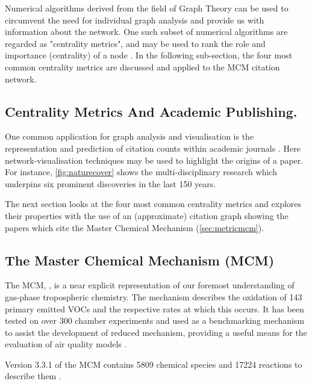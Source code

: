 Numerical algorithms derived from the field of Graph Theory can be used to circumvent the need for individual graph analysis and provide us with information about the network. One such subset of numerical algorithms are regarded as "centrality metrics", and may be used to rank the role and importance (centrality) of a node \citep{squaretower}. In the following sub-section, the four most common centrality metrics are discussed and applied to the MCM citation network.


\subsection{Centrality Metrics And Academic Publishing.}


One common application for graph analysis and visualisation is the representation and prediction of citation counts within academic journals \citep{cocite,google,naturecitation,netcoauthor}. Here network-visualisation techniques may be used to highlight the origins of a paper. For instance, \autoref{fig:naturecover} shows the multi-disciplinary research which underpins six prominent discoveries in the last 150 years.

The next section looks at the four most common centrality metrics and explores their properties with the use of an (approximate) citation graph showing the papers which cite the Master Chemical Mechanism (\autoref{sec:metricmcm}).



\subsection{The Master Chemical Mechanism (MCM)}\label{sec:metricmcm}

The MCM, \citep{mcm}, is a near explicit representation of our foremost understanding of gas-phase tropospheric chemistry. The mechanism describes the oxidation of 143 primary emitted VOCs and the respective rates at which this occurs. It has been tested on over 300 chamber experiments and used as a benchmarking mechanism to assist the development of reduced mechanism, providing a useful means for the evaluation of air quality models \citep{defra1}.

Version 3.3.1 of the MCM contains 5809 chemical species and 17224 reactions to describe them \citep{isopmcm}.




